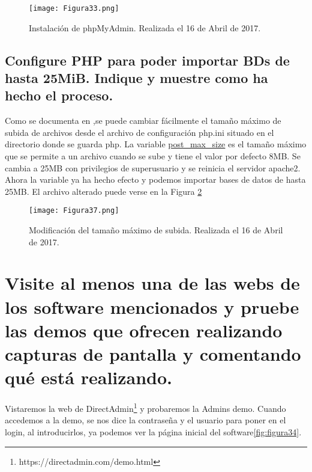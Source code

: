 \begin{figure}[H] 
\centering
\texttt{[image: Figura33.png]}  
\caption{Instalación de phpMyAdmin. Realizada el 16 de Abril de 2017.} \label{fig:figura33}
\end{figure}

\vspace{6mm}

\subsection{Configure PHP para poder importar BDs de hasta 25MiB. Indique y muestre como ha hecho el proceso.}

Como se documenta en \cite{postmax},se puede cambiar fácilmente el tamaño máximo de subida de archivos desde el archivo de configuración php.ini situado en el directorio donde se guarda php. La
variable \url{post_max_size} es el tamaño máximo que se permite a un archivo cuando se sube y tiene el valor por defecto 8MB. Se cambia a 25MB con privilegios de 
superusuario y se reinicia el servidor apache2. Ahora la variable ya ha hecho efecto y podemos importar bases de datos de hasta 25MB. El archivo alterado puede
verse en la Figura \ref{fig:figura37}


\begin{figure}[H] 
\centering
\texttt{[image: Figura37.png]}  
\caption{Modificación del tamaño máximo de subida. Realizada el 16 de Abril de 2017.} \label{fig:figura37}
\end{figure}



\section{Visite al menos una de las webs de los software mencionados y pruebe las demos que ofrecen realizando capturas de pantalla y comentando qué está realizando.}

Vistaremos la web de DirectAdmin\footnote{https://directadmin.com/demo.html} y probaremos la Admins demo. Cuando accedemos a la demo, se nos dice la
contraseña y el usuario para poner en el login, al introducirlos, ya podemos ver la página inicial del software\ref{fig:figura34}.

